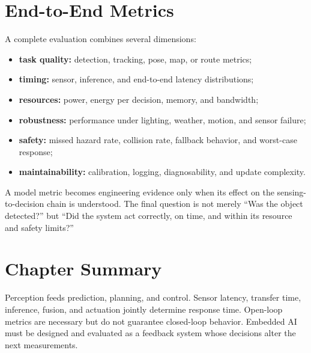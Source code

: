 \section{End-to-End Metrics}

A complete evaluation combines several dimensions:

\begin{itemize}
    \item \textbf{task quality:} detection, tracking, pose, map, or route metrics;
    \item \textbf{timing:} sensor, inference, and end-to-end latency distributions;
    \item \textbf{resources:} power, energy per decision, memory, and bandwidth;
    \item \textbf{robustness:} performance under lighting, weather, motion, and sensor failure;
    \item \textbf{safety:} missed hazard rate, collision rate, fallback behavior, and worst-case response;
    \item \textbf{maintainability:} calibration, logging, diagnosability, and update complexity.
\end{itemize}

\begin{keyinsight}
A model metric becomes engineering evidence only when its effect on the sensing-to-decision chain is understood. The final question is not merely ``Was the object detected?'' but ``Did the system act correctly, on time, and within its resource and safety limits?''
\end{keyinsight}

\section{Chapter Summary}

Perception feeds prediction, planning, and control. Sensor latency, transfer time, inference, fusion, and actuation jointly determine response time. Open-loop metrics are necessary but do not guarantee closed-loop behavior. Embedded AI must be designed and evaluated as a feedback system whose decisions alter the next measurements.
